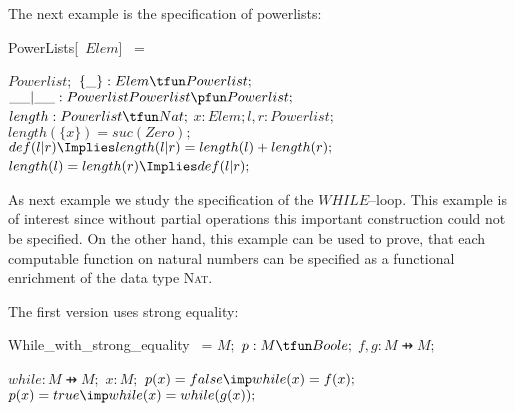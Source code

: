 \documentclass[landscape, autoslides, light]{mmiss}
\newcommand{\ns}{\normalsize}
\begin{document}
\begin{Package}[Label={FSDPT}, Title={Formal Specification of Data and Process Types}, ShortTitle={FSDPT}, Authors={Horst Reichel}, Date={February 2003}, LevelOfDetail=Lecture, Language=en-GB]
\begin{Section}[Title={Initial Algebras as Data Types}, Label={section3}]
\begin{Section}[Title={Partial Constructors}, Label={section3_5}]
\begin{Paragraph}[Label=Paragraph77]
The next example is the specification of powerlists: \small
\begin{SpecDefn}{PowerLists}[\Sort~\(Elem\)] ~=
 \item[\Then] \item[\Free~\Group]
\begin{Items}
\I\Sort \( Powerlist ; \) \I\Ops \( \{\_\} : Elem \tfun
Powerlist;\)
 \\ \( \_\_|\_\_ : Powerlist \* Powerlist \pfun Powerlist; \)
 \\ \( length : Powerlist \tfun Nat; \)
 \I\Vars \( x : Elem; l, r : Powerlist; \)
 \I\Axioms~
 \\ \( length( \{x\}) = suc(Zero);\)
 \\ \( def (l | r) \Implies length( l | r ) = length(l ) +
 length(r); \)
 \\ \( length(l) = length(r) \Implies def (l | r) ;\)
 ~\EndGroup \end{Items} \item[\End] \end{SpecDefn}

\end{Paragraph}
\begin{Paragraph}[Title={$WHILE$--loop}, Label=Paragraph78]
\ns

 As next example we study the specification of the
$WHILE$--loop. This example is of interest since without partial
operations this important construction could not be specified. On
the other hand, this example can be used to prove, that each
computable function on natural numbers can be specified as a
functional enrichment of the data type \textsc{Nat}.



\end{Paragraph}
\begin{Paragraph}[Label=Paragraph79]
\small
The first version uses strong equality:

\begin{SpecDefn}{While\_with\_strong\_equality} ~=
 \I \Then
 \I\Sort \(M; \)
 \I\Op \( p : M \tfun Boole ;\)
 \I\Ops \( f,g : M \pfun M;\) \I\Then
 \I{\Free~\Group} \begin{Items}
 \I\Op \( while : M \pfun M; \)
 \I\Var \( x : M; \)
 \I\Axioms \(  p(x) = false \imp while(x ) = f(x); \)
 \\ \(p(x) = true \imp while(x) = while(g(x));\) \EndGroup
 \end{Items}
 \I\End
 \end{SpecDefn}


\end{Paragraph}
\end{Section}
\end{Section}
\end{Package}
\end{document}
